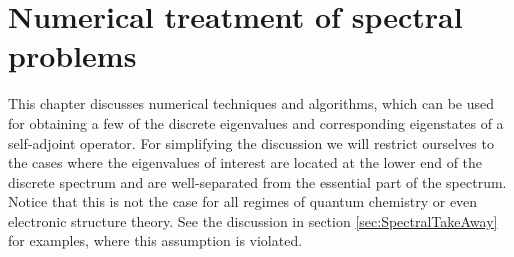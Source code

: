 \chapter{Numerical treatment of spectral problems}
\label{ch:numeigen}


\noindent
This chapter discusses numerical techniques
and algorithms,
which can be used for obtaining a few of the discrete
eigenvalues and corresponding eigenstates
of a self-adjoint operator.
For simplifying the discussion we will restrict ourselves
to the cases where the eigenvalues of interest
are located at the lower end of the discrete spectrum
and are well-separated from the essential part of the spectrum.
Notice that this is not the case for all regimes of quantum chemistry
or even electronic structure theory.
See the discussion in section \vref{sec:SpectralTakeAway} for examples,
where this assumption is violated.



